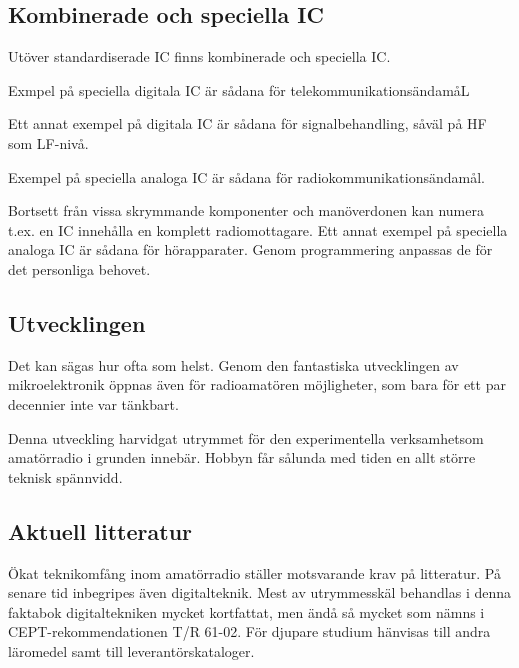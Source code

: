 \subsection{Kombinerade och speciella IC}

Utöver standardiserade IC finns kombinerade och speciella IC.

Exmpel på speciella digitala IC är sådana för telekommunikationsändamåL

Ett annat exempel på digitala IC är sådana för signalbehandling, såväl på HF som
LF-nivå.

Exempel på speciella analoga IC är sådana för radiokommunikationsändamål.

Bortsett från vissa skrymmande komponenter och manöverdonen kan numera t.ex. en
IC innehålla en komplett radiomottagare. Ett annat exempel på speciella analoga
IC är sådana för hörapparater. Genom programmering anpassas de för det
personliga behovet.

\subsection{Utvecklingen}

Det kan sägas hur ofta som helst. Genom den fantastiska utvecklingen av
mikroelektronik öppnas även för radioamatören möjligheter, som bara för ett par
decennier inte var tänkbart.

Denna utveckling harvidgat utrymmet för den experimentella verksamhetsom
amatörradio i grunden innebär. Hobbyn får sålunda med tiden en allt större
teknisk spännvidd.

\subsection{Aktuell litteratur}

Ökat teknikomfång inom amatörradio ställer motsvarande krav på litteratur. På
senare tid inbegripes även digitalteknik. Mest av utrymmesskäl behandlas i denna
faktabok digitaltekniken mycket kortfattat, men ändå så mycket som nämns i
CEPT-rekommendationen T/R 61-02. För djupare studium hänvisas till andra
läromedel samt till leverantörskataloger.
